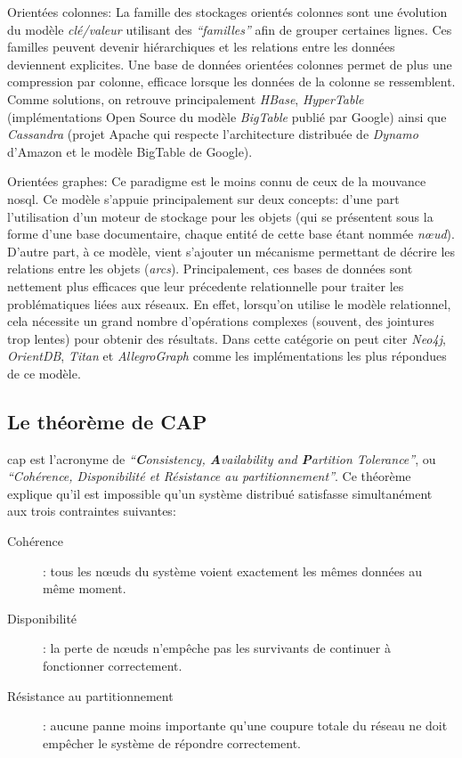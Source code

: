   \textsf{Orientées colonnes}: La famille des stockages orientés
  colonnes sont une évolution du modèle \textit{clé/valeur} utilisant
  des \textit{``familles''} afin de grouper certaines lignes. Ces
  familles peuvent devenir hiérarchiques et les relations entre les
  données deviennent explicites. Une base de données orientées
  colonnes permet de plus une compression par colonne, efficace
  lorsque les données de la colonne se ressemblent. Comme solutions,
  on retrouve principalement \emph{HBase}, \emph{HyperTable}
  (implémentations Open Source du modèle \emph{BigTable}
  \cite{chang2008bigtable} publié par Google) ainsi que
  \emph{Cassandra} (projet Apache qui respecte l'architecture
  distribuée de \emph{Dynamo} \cite{decandia2007dynamo} d'Amazon et le
  modèle BigTable de Google).\bigskip

  \textsf{Orientées graphes}: Ce paradigme est le moins connu de ceux
  de la mouvance \acrshort{nosql}. Ce modèle s'appuie principalement
  sur deux concepts: d'une part l'utilisation d'un moteur de stockage
  pour les objets (qui se présentent sous la forme d'une base
  documentaire, chaque entité de cette base étant nommée
  \emph{nœud}). D'autre part, à ce modèle, vient s'ajouter un
  mécanisme permettant de décrire les relations entre les objets
  (\emph{arcs}). Principalement, ces bases de données sont nettement
  plus efficaces que leur précedente relationnelle pour traiter les
  problématiques liées aux réseaux.  En effet, lorsqu'on utilise le
  modèle relationnel, cela nécessite un grand nombre d'opérations
  complexes (souvent, des jointures trop lentes) pour obtenir des
  résultats. Dans cette catégorie on peut citer \emph{Neo4j},
  \emph{OrientDB}, \emph{Titan} et \emph{AllegroGraph} comme les
  implémentations les plus répondues de ce modèle.

  \subsection{Le théorème de CAP }
  \label{sec:cap}
  \acrshort{cap} \cite{brewer2000towards} est l'acronyme de
  \textit{``\textbf{C}onsistency, \textbf{A}vailability and
    \textbf{P}artition Tolerance''}, ou \textit{``Cohérence,
    Disponibilité et Résistance au partitionnement''}. Ce théorème
  explique qu'il est impossible qu'un système distribué satisfasse
  simultanément aux trois contraintes suivantes:\medskip

  \renewcommand{\descriptionlabel}[1]{\hspace{1cm}\textbullet~\textsf{#1}}
  \begin{description}
  \item [Cohérence]: tous les nœuds du système voient exactement les
    mêmes données au même moment.

  \item [Disponibilité]: la perte de nœuds n'empêche pas les
    survivants de continuer à fonctionner correctement.

  \item [Résistance au partitionnement]: aucune panne moins importante
    qu'une coupure totale du réseau ne doit empêcher le système de
    répondre correctement.
  \end{description}
  \enddescription
  \bigskip

